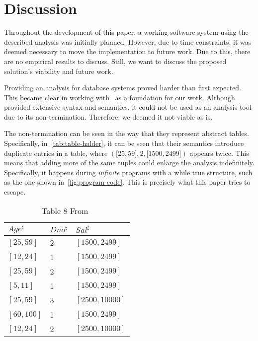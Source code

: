 \section{Discussion}\label{sec:discussion}
Throughout the development of this paper, a working software system using the described analysis  was initially planned.
However, due to time constraints, it was deemed necessary to move the implementation to future work.
Due to this, there are no empirical results to discuss.
Still, we want to discuss the proposed solution's viability and future work.


Providing an analysis for database systems proved harder than first expected.
This became clear in working with~\cite{halder_abstract_2012} as a foundation for our work.
Although~\cite{halder_abstract_2012} provided extensive syntax and semantics, it could not be used as an analysis tool due to its non-termination.
Therefore, we deemed it not viable as is.

The non-termination can be seen in the way that they represent abstract tables.
Specifically, in~\autoref{tab:table-halder}, it can be seen that their semantics introduce duplicate entries in a table, where $({[}25,59{]},2,{[}1500,2499{]})$ appears twice.
This means that adding more of the same tuples could enlarge the analysis indefinitely.
Specifically, it happens during \textit{infinite} programs with a while true structure, such as the one shown in~\autoref{fig:program-code}.
This is precisely what this paper tries to escape.


\begin{table}
    \renewcommand{\arraystretch}{1.3}
    \centering
    \caption{Table 8 From~\cite{halder_abstract_2012}}
    \begin{tabular}{lll}
        \toprule
        $Age^\sharp$ & $Dno^\sharp$ & $Sal^\sharp$   \\ \midrule
        $[25,59]$    & 2            & $[1500,2499]$  \\
        $[12,24]$    & 1            & $[1500,2499]$  \\
        $[25,59]$    & 2            & $[1500,2499]$  \\
        $[5,11]$     & 1            & $[1500,2499]$  \\
        $[25,59]$    & 3            & $[2500,10000]$ \\
        $[60,100]$   & 1            & $[1500,2499]$  \\
        $[12,24]$    & 2            & $[2500,10000]$ \\ \bottomrule
    \end{tabular}\label{tab:table-halder}
\end{table}


